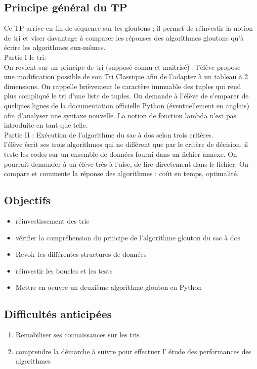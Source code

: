 \documentclass[12pt,french]{report}
\begin{document}
\subsection{Principe général du TP }
Ce TP arrive en fin de séquence sur les gloutons ; il permet de réinvestir la notion de tri et viser davantage à comparer les réponses des algorithmes gloutons qu'à écrire les algorithmes eux-mêmes.\\
Partie I le tri:\\
On revient sur un principe de tri (supposé connu et maitrisé) ; l'élève propose une modification possible de son Tri Classique afin de l'adapter à un tableau à 2 dimensions.
On rappelle brièvement le caractère immuable des tuples qui rend plus compliqué le tri d'une liste de tuples.
On demande à l'élève de s'emparer de quelques lignes de la documentation officielle
Python (éventuellement en anglais) afin d'analyser une syntaxe nouvelle. La notion de fonction lambda n'est pas introduite en tant que telle.\\
 Partie II : Exécution de l'algorithme du sac à dos selon trois critères.\\
l'élève écrit ses trois algorithmes qui ne différent que par le critère de décision. il teste les codes sur un ensemble de données fourni dans un fichier annexe.
On pourrait demander à un élève très à l'aise, de lire directement dans le fichier.
On compare et commente la réponse des algorithmes : coût en temps, optimalité.
\subsection{Objectifs }
\begin{itemize}[$\bullet$]
	\item réinvestissement des tris
	\item vérifier la compréhension du principe de l'algorithme glouton du sac à dos 
	\item Revoir les différentes structures de données 
	\item réinvestir les boucles et les tests
	\item Mettre en oeuvre un deuxième algorithme glouton en Python
\end{itemize}
\subsection{Difficultés anticipées }
\begin{enumerate}
	\item Remobiliser ses connaissances sur les tris
	\item comprendre la démarche à suivre pour effectuer l' étude des performances des algorithmes

\end{enumerate}
\end{document}
